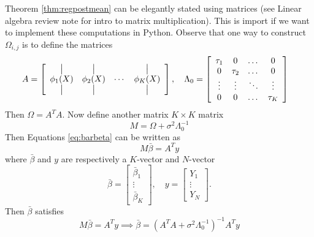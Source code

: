 Theorem \ref{thm:regpostmean} can be elegantly stated using matrices (see Linear algebra review note for intro to matrix multiplication).  This is import if we want to implement these computations in Python. Observe that one way to construct $\Omega_{i,j}$ is to define the matrices
\begin{align*}
A &= \left[ 
\begin{array}{cccc}
\,\big|\, & \,\big|\,& & \,\big|\,\\
\phi_1(X) & \phi_2(X) & \cdots & \phi_K(X) \\
\,\big|\, & \,\big|\,& & \,\big|\,
\end{array}
\right],\quad 
\Lambda_0 = \left[
\begin{array}{cccc}
\tau_1 & 0 & \dots & 0 \\
0 & \tau_2 & \dots & 0 \\
\vdots & \vdots & \ddots & \vdots \\
0 & 0 & \dots & \tau_K \\
\end{array}
\right]
\end{align*}
Then $\Omega = A^TA$. 
Now define another matrix $K\times K$ matrix 
\begin{equation*}
M = \Omega + \sigma^2\Lambda_0^{-1}
\end{equation*}
Then Equations \ref{eq:barbeta} can be written as 
\begin{equation*}
M \bar{\beta} = A^Ty
\end{equation*}
where $\bar{\beta}$ and $y$ are respectively a $K$-vector and $N$-vector
\begin{equation*}
\bar{\beta} = \left[\begin{array}{c} \bar{\beta}_1\\ 
\vdots\\
\bar{\beta}_K \end{array}\right],\quad y = \left[\begin{array}{c}Y_1\\ 
\vdots\\
Y_N \end{array}\right]. 
\end{equation*}
Then $\bar{\beta}$ satisfies  
\begin{equation*}
M\bar{\beta} = A^Ty  \implies \bar{\beta} =  \left( A^TA+ \sigma^2\Lambda_0^{-1}\right)^{-1}A^Ty
\end{equation*}



